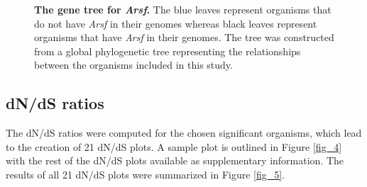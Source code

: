 \documentclass{article}
\begin{document}
\begin{figure}[]
\centering
{}
\caption{\textbf{The gene tree for \textit{Arsf}.} The blue leaves represent organisms that do not have \textit{Arsf} in their genomes whereas black leaves represent organisms that have \textit{Arsf} in their genomes. The tree was constructed from a global phylogenetic tree representing the relationships between the organisms included in this study.}
\label{fig_3}
\end{figure}

\subsection*{dN/dS ratios}

The dN/dS ratios were computed for the chosen significant organisms, which lead to the creation of 21 dN/dS plots. A sample plot is outlined in Figure \ref{fig_4} with the rest of the dN/dS plots available as supplementary information. The results of all 21 dN/dS plots were summarized in Figure \ref{fig_5}. 
\end{document}
